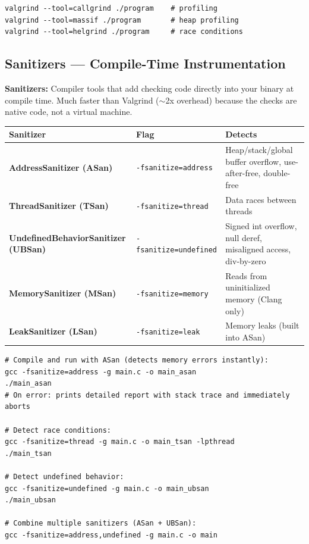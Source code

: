 \documentclass[11pt,a4paper]{article}
\newcommand{\code}[1]{\texttt{\small\colorbox{codebg}{\color{codekw}#1}}}
\newcommand{\term}[1]{\textbf{\color{darkblue}#1}}
\begin{document}
\begin{lstlisting}[style=bashstyle]
valgrind --tool=callgrind ./program    # profiling
valgrind --tool=massif ./program       # heap profiling
valgrind --tool=helgrind ./program     # race conditions
\end{lstlisting}

\subsection{Sanitizers --- Compile-Time Instrumentation}

\begin{mydef}
\textbf{Sanitizers:} Compiler tools that add checking code directly into your binary at compile time. Much faster than Valgrind ($\sim$2x overhead) because the checks are native code, not a virtual machine.
\end{mydef}

\begin{center}
\begin{tabular}{L{4.5cm} L{5cm} L{4cm}}
\toprule
\textbf{Sanitizer} & \textbf{Flag} & \textbf{Detects} \\
\midrule
\term{AddressSanitizer (ASan)} & \code{-fsanitize=address} & Heap/stack/global buffer overflow, use-after-free, double-free \\[4pt]
\term{ThreadSanitizer (TSan)} & \code{-fsanitize=thread} & Data races between threads \\[4pt]
\term{UndefinedBehaviorSanitizer (UBSan)} & \code{-fsanitize=undefined} & Signed int overflow, null deref, misaligned access, div-by-zero \\[4pt]
\term{MemorySanitizer (MSan)} & \code{-fsanitize=memory} & Reads from uninitialized memory (Clang only) \\[4pt]
\term{LeakSanitizer (LSan)} & \code{-fsanitize=leak} & Memory leaks (built into ASan) \\
\bottomrule
\end{tabular}
\end{center}

\begin{lstlisting}[style=bashstyle]
# Compile and run with ASan (detects memory errors instantly):
gcc -fsanitize=address -g main.c -o main_asan
./main_asan
# On error: prints detailed report with stack trace and immediately aborts

# Detect race conditions:
gcc -fsanitize=thread -g main.c -o main_tsan -lpthread
./main_tsan

# Detect undefined behavior:
gcc -fsanitize=undefined -g main.c -o main_ubsan
./main_ubsan

# Combine multiple sanitizers (ASan + UBSan):
gcc -fsanitize=address,undefined -g main.c -o main
\end{lstlisting}
\end{document}
